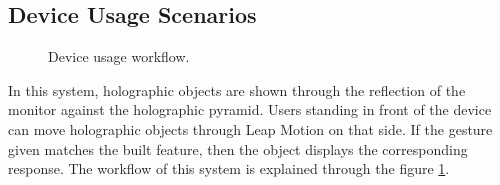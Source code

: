 \documentclass[conference]{IEEEtran}
\begin{document}
	\subsection{Device Usage Scenarios}
		\vspace{-2ex}
		\begin{figure}[h]
			\caption{Device usage workflow.}
			\label{fig:alurkerja}
		\end{figure}
		\vspace{-2ex}
		In this system, holographic objects are shown through the reflection of the monitor against the holographic pyramid. Users standing in front of the device can move holographic objects through Leap Motion on that side. If the gesture given matches the built feature, then the object displays the corresponding response. The workflow of this system is explained through the figure \ref{fig:alurkerja}.
		
\end{document}
